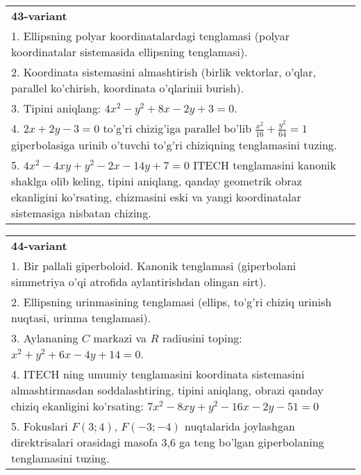 \documentclass{article}
\begin{document}
\begin{tabular}{m{17cm}}
\textbf{43-variant}\\
1. Ellipsning polyar koordinatalardagi tenglamasi (polyar koordinatalar sistemasida ellipsning tenglamasi).\\

2. Koordinata sistemasini almashtirish (birlik vektorlar, o'qlar, parallel ko'chirish, koordinata o'qlarinii burish).\\

3. Tipini aniqlang: $4x^{2}-y^{2}+8x-2y+3=0$.\\

4. $2x + 2y - 3 = 0$ to'g'ri chizig'iga parallel bo'lib $\frac{x^{2}}{16} + \frac{y^{2}}{64} = 1$ giperbolasiga urinib o'tuvchi to'g'ri chiziqning tenglamasini tuzing.  \\

5. $4x^{2} - 4xy + y^{2} - 2x - 14y + 7 = 0$ ITECH tenglamasini kanonik shaklga olib keling, tipini aniqlang, qanday geometrik obraz ekanligini ko'rsating, chizmasini eski va yangi koordinatalar sistemasiga nisbatan chizing.  
\end{tabular}
\vspace{1cm}


\begin{tabular}{m{17cm}}
\textbf{44-variant}\\
1. Bir pallali giperboloid. Kanonik tenglamasi (giperbolani simmetriya o'qi atrofida aylantirishdan olingan sirt).\\

2. Ellipsning urinmasining tenglamasi (ellips, to'g'ri chiziq urinish nuqtasi, urinma tenglamasi).\\

3. Aylananing $C$ markazi va $R$ radiusini toping: $x^2+y^2+6x-4y+14=0$.\\

4. ITECH ning umumiy tenglamasini koordinata sistemasini almashtirmasdan soddalashtiring, tipini aniqlang, obrazi qanday chiziq ekanligini ko'rsating: $7x^{2} - 8xy + y^{2} - 16x - 2y - 51 = 0$\\

5. Fokuslari $F(3;4)$, $F(-3;-4)$ nuqtalarida joylashgan direktrisalari orasidagi masofa 3,6 ga teng bo'lgan giperbolaning tenglamasini tuzing.  
\end{tabular}
\vspace{1cm}
\end{document}
